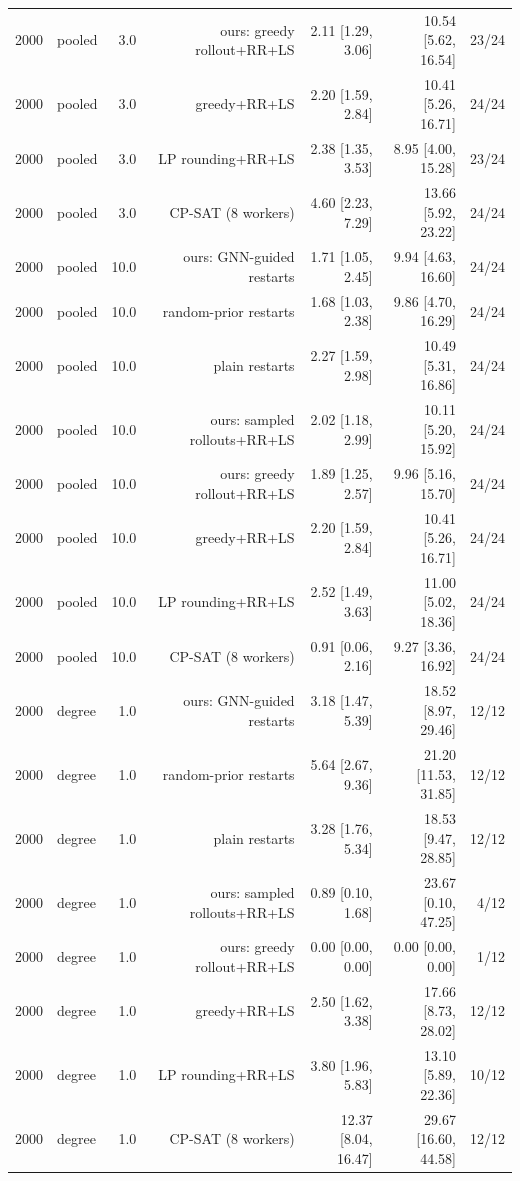 \begin{table}[t]
\begin{tabular}{llrrrrr}
2000 & pooled & 3.0 & ours: greedy rollout+RR+LS & 2.11 [1.29, 3.06] & 10.54 [5.62, 16.54] & 23/24 \\
2000 & pooled & 3.0 & greedy+RR+LS & 2.20 [1.59, 2.84] & 10.41 [5.26, 16.71] & 24/24 \\
2000 & pooled & 3.0 & LP rounding+RR+LS & 2.38 [1.35, 3.53] & 8.95 [4.00, 15.28] & 23/24 \\
2000 & pooled & 3.0 & CP-SAT (8 workers) & 4.60 [2.23, 7.29] & 13.66 [5.92, 23.22] & 24/24 \\
2000 & pooled & 10.0 & ours: GNN-guided restarts & 1.71 [1.05, 2.45] & 9.94 [4.63, 16.60] & 24/24 \\
2000 & pooled & 10.0 & random-prior restarts & 1.68 [1.03, 2.38] & 9.86 [4.70, 16.29] & 24/24 \\
2000 & pooled & 10.0 & plain restarts & 2.27 [1.59, 2.98] & 10.49 [5.31, 16.86] & 24/24 \\
2000 & pooled & 10.0 & ours: sampled rollouts+RR+LS & 2.02 [1.18, 2.99] & 10.11 [5.20, 15.92] & 24/24 \\
2000 & pooled & 10.0 & ours: greedy rollout+RR+LS & 1.89 [1.25, 2.57] & 9.96 [5.16, 15.70] & 24/24 \\
2000 & pooled & 10.0 & greedy+RR+LS & 2.20 [1.59, 2.84] & 10.41 [5.26, 16.71] & 24/24 \\
2000 & pooled & 10.0 & LP rounding+RR+LS & 2.52 [1.49, 3.63] & 11.00 [5.02, 18.36] & 24/24 \\
2000 & pooled & 10.0 & CP-SAT (8 workers) & 0.91 [0.06, 2.16] & 9.27 [3.36, 16.92] & 24/24 \\
2000 & degree & 1.0 & ours: GNN-guided restarts & 3.18 [1.47, 5.39] & 18.52 [8.97, 29.46] & 12/12 \\
2000 & degree & 1.0 & random-prior restarts & 5.64 [2.67, 9.36] & 21.20 [11.53, 31.85] & 12/12 \\
2000 & degree & 1.0 & plain restarts & 3.28 [1.76, 5.34] & 18.53 [9.47, 28.85] & 12/12 \\
2000 & degree & 1.0 & ours: sampled rollouts+RR+LS & 0.89 [0.10, 1.68] & 23.67 [0.10, 47.25] & 4/12 \\
2000 & degree & 1.0 & ours: greedy rollout+RR+LS & 0.00 [0.00, 0.00] & 0.00 [0.00, 0.00] & 1/12 \\
2000 & degree & 1.0 & greedy+RR+LS & 2.50 [1.62, 3.38] & 17.66 [8.73, 28.02] & 12/12 \\
2000 & degree & 1.0 & LP rounding+RR+LS & 3.80 [1.96, 5.83] & 13.10 [5.89, 22.36] & 10/12 \\
2000 & degree & 1.0 & CP-SAT (8 workers) & 12.37 [8.04, 16.47] & 29.67 [16.60, 44.58] & 12/12 \\

\end{tabular}
\end{table}

